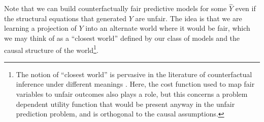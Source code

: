 
Note that we can build counterfactually fair
predictive models for some $\hat Y$ even if the 
structural equations that generated $Y$ are unfair. The idea is that we
are learning a projection of $Y$ into an alternate world where it
would be fair, which we may think of as a
``closest world'' defined by our class of models and the
causal structure of the world\footnote{The notion of ``closest world''
  is pervasive in the literature of counterfactual inference under
  different meanings \citep{pearl:00, halpern:16}.  Here, the cost
  function used to map fair variables to unfair outcomes also plays a
  role, but this concerns a problem dependent utility function that
  would be present anyway in the unfair prediction problem, and is
  orthogonal to the causal assumptions.}.






